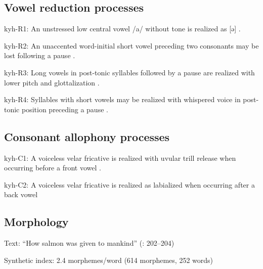 {\subsection*{Vowel reduction processes}
\begin{appendixdesc}

\item[kyh-R1:] An unstressed low central vowel /a/ without tone is realized as [ə] \citep[11]{Bright1957}.

\item[kyh-R2:] An unaccented word-initial short vowel preceding two consonants may be lost following a pause \citep[53]{Bright1957}.

\item[kyh-R3:] Long vowels in post-tonic syllables followed by a pause are realized with lower pitch and glottalization \citep[13]{Bright1957}.

\item[kyh-R4:] Syllables with short vowels may be realized with whispered voice in post-tonic position preceding a pause \citep[13]{Bright1957}.
\end{appendixdesc}
\subsection*{Consonant allophony processes}
\begin{appendixdesc}

\item[kyh-C1:] A voiceless velar fricative is realized with uvular trill release when occurring before a front vowel \citep{Bright1957}.

\item[kyh-C2:] A voiceless velar fricative is realized as labialized when occurring after a back vowel \citep[8]{Bright1957}
\end{appendixdesc}
\subsection*{Morphology}

\begin{appendixdesc}

\item[Text:] “How salmon was given to mankind” (\citealt{AnguloFreeland1971}: 202--204)

\item[Synthetic index:] 2.4 morphemes/word (614 morphemes, 252 words)
\end{appendixdesc}
}
